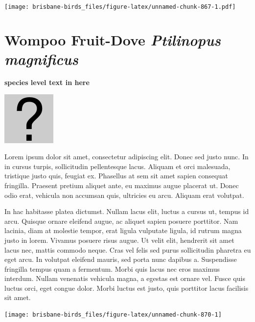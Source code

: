 \documentclass[]{book}
\let\origfigure\figure
\let\endorigfigure\endfigure
\renewenvironment{figure}[1][2] {
  \expandafter\origfigure\expandafter[H]
} {
  \endorigfigure
}
\begin{document}
\begin{figure}
\centering
\texttt{[image: brisbane-birds\_files/figure-latex/unnamed-chunk-867-1.pdf]}
\caption{\label{fig:unnamed-chunk-867}insert figure caption}
\end{figure}

\section{\texorpdfstring{Wompoo Fruit-Dove \emph{Ptilinopus
magnificus}}{Wompoo Fruit-Dove Ptilinopus magnificus}}\label{wompoo-fruit-dove-ptilinopus-magnificus}

\textbf{species level text in here}

\begin{figure}
\centering
\includegraphics{assets/missing.png}
\caption{No image for species}
\end{figure}

Lorem ipsum dolor sit amet, consectetur adipiscing elit. Donec sed justo
nunc. In in cursus turpis, sollicitudin pellentesque lacus. Aliquam et
orci malesuada, tristique justo quis, feugiat ex. Phasellus at sem sit
amet sapien consequat fringilla. Praesent pretium aliquet ante, eu
maximus augue placerat ut. Donec odio erat, vehicula non accumsan quis,
ultricies eu arcu. Aliquam erat volutpat.

In hac habitasse platea dictumst. Nullam lacus elit, luctus a cursus ut,
tempus id arcu. Quisque ornare eleifend augue, ac aliquet sapien posuere
porttitor. Nam lacinia, diam at molestie tempor, erat ligula vulputate
ligula, id rutrum magna justo in lorem. Vivamus posuere risus augue. Ut
velit elit, hendrerit sit amet lacus nec, mattis commodo neque. Cras vel
felis sed purus sollicitudin pharetra eu eget arcu. In volutpat eleifend
mauris, sed porta nunc dapibus a. Suspendisse fringilla tempus quam a
fermentum. Morbi quis lacus nec eros maximus interdum. Nullam venenatis
vehicula magna, a egestas est ornare vel. Fusce quis luctus orci, eget
congue dolor. Morbi luctus est justo, quis porttitor lacus facilisis sit
amet.

\begin{figure}
\texttt{[image: brisbane-birds\_files/figure-latex/unnamed-chunk-870-1]} \caption{insert figure caption}\label{fig:unnamed-chunk-870}
\end{figure}
\end{document}
